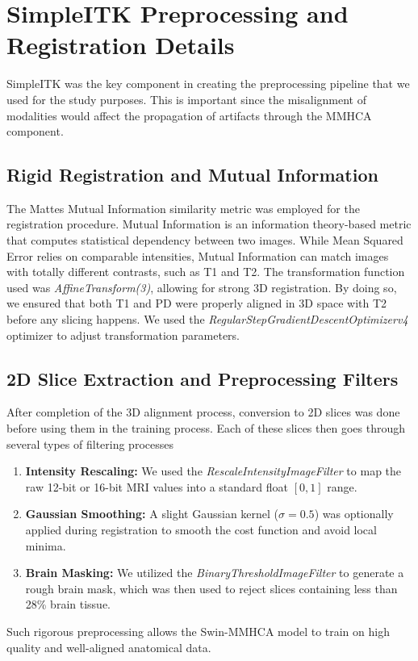 \section{SimpleITK Preprocessing and Registration Details}
SimpleITK was the key component in creating the preprocessing pipeline that we used for the study purposes. This is important since the misalignment of modalities would affect the propagation of artifacts through the MMHCA component.

\subsection{Rigid Registration and Mutual Information}
The Mattes Mutual Information similarity metric was employed for the registration procedure. Mutual Information is an information theory-based metric that computes statistical dependency between two images. While Mean Squared Error relies on comparable intensities, Mutual Information can match images with totally different contrasts, such as T1 and T2.
The transformation function used was \textit{AffineTransform(3)}, allowing for strong 3D registration. By doing so, we ensured that both T1 and PD were properly aligned in 3D space with T2 before any slicing happens. We used the \textit{RegularStepGradientDescentOptimizerv4} optimizer to adjust transformation parameters.

\subsection{2D Slice Extraction and Preprocessing Filters}
After completion of the 3D alignment process, conversion to 2D slices was done before using them in the training process.
Each of these slices then goes through several types of filtering processes
\begin{enumerate}
    \item \textbf{Intensity Rescaling:} We used the \textit{RescaleIntensityImageFilter} to map the raw 12-bit or 16-bit MRI values into a standard float $[0, 1]$ range.
    \item \textbf{Gaussian Smoothing:} A slight Gaussian kernel ($\sigma = 0.5$) was optionally applied during registration to smooth the cost function and avoid local minima.
    \item \textbf{Brain Masking:} We utilized the \textit{BinaryThresholdImageFilter} to generate a rough brain mask, which was then used to reject slices containing less than 28\% brain tissue.
\end{enumerate}
Such rigorous preprocessing allows the Swin-MMHCA model to train on high quality and well-aligned anatomical data.

